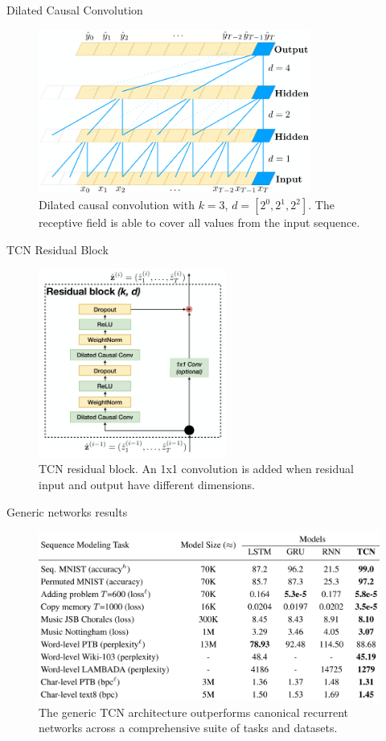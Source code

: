 \documentclass{beamer}
\begin{document}
\begin{frame}{Dilated Causal Convolution}
\begin{figure}[h]
\includegraphics[width=0.8\textwidth]{img/dilated}
\caption{Dilated causal convolution with $k=3$, $d=[2^0, 2^1, 2^2]$. The receptive field is able to cover all values from the input sequence.}
\end{figure}
\end{frame}
\begin{frame}{TCN Residual Block}
\begin{figure}[h]
\includegraphics[width=0.55\textwidth]{img/block}
\caption{TCN residual block. An 1x1 convolution is added when residual input and output have different dimensions.}
\end{figure}
\end{frame}
\begin{frame}{Generic networks results}
\begin{figure}[h]
\includegraphics[width=1.0\textwidth]{img/results}
\caption{The generic TCN architecture outperforms canonical recurrent networks across a
comprehensive suite of tasks and datasets.}
\end{figure}
\end{frame}
\end{document}
